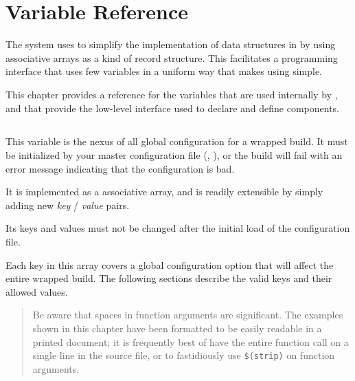 %
%
%
%
\chapter{Variable Reference}\label{chap:variables}

The \lmsbw system uses \gmsl to simplify the implementation of data
structures in \make by using associative arrays as a kind of record
structure.  This facilitates a programming interface that uses few
variables in a uniform way that makes using \lmsbw simple.

This chapter provides a reference for the variables that are used
internally by \lmsbw, and that provide the low-level interface used to
declare and define components.

\section{\lmsbwconfiguration}\label{variables:lmsbw-configuration}

This variable is the nexus of all global configuration for a wrapped
build.  It must be initialized by your master configuration file
(, ), or the
build will fail with an error message indicating that the
configuration is bad.

It is implemented as a \gmsl associative array, and is readily
extensible by simply adding new \emph{key} / \emph{value} pairs.

Its keys and values must not be changed after the initial load of the
configuration file.

Each key in this array covers a global configuration option that will
affect the entire wrapped build.  The following sections describe the
valid keys and their allowed values.

\begin{quote}
Be aware that spaces in \gnumake function arguments are significant.
The examples shown in this chapter have been formatted to be easily
readable in a printed document; it is frequently best of have the
entire function call on a single line in the source file, or to
fastidiously use \texttt{\$(strip)} on function arguments.
\end{quote}

